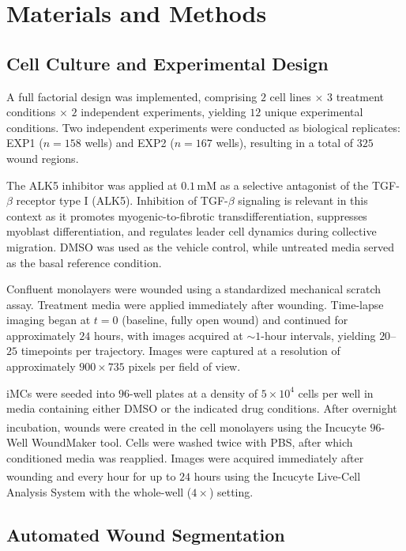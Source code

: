 \section{Materials and Methods}

\subsection{Cell Culture and Experimental Design}

A full factorial design was implemented, comprising $2$ cell lines $\times$ $3$ treatment conditions $\times$ $2$ independent experiments, yielding $12$ unique experimental conditions. Two independent experiments were conducted as biological replicates: EXP1 ($n = 158$ wells) and EXP2 ($n = 167$ wells), resulting in a total of $325$ wound regions.

The ALK5 inhibitor was applied at $0.1\,\mathrm{mM}$ as a selective antagonist of the TGF-$\beta$ receptor type I (ALK5). Inhibition of TGF-$\beta$ signaling is relevant in this context as it promotes myogenic-to-fibrotic transdifferentiation, suppresses myoblast differentiation, and regulates leader cell dynamics during collective migration. DMSO was used as the vehicle control, while untreated media served as the basal reference condition.

Confluent monolayers were wounded using a standardized mechanical scratch assay. Treatment media were applied immediately after wounding. Time-lapse imaging began at $t = 0$ (baseline, fully open wound) and continued for approximately $24$ hours, with images acquired at $\sim 1$-hour intervals, yielding $20$--$25$ timepoints per trajectory. Images were captured at a resolution of approximately $900 \times 735$ pixels per field of view.

iMCs were seeded into $96$-well plates at a density of $5 \times 10^{4}$ cells per well in media containing either DMSO or the indicated drug conditions. After overnight incubation, wounds were created in the cell monolayers using the Incucyte\textsuperscript{\textregistered} $96$-Well WoundMaker tool. Cells were washed twice with PBS, after which conditioned media was reapplied. Images were acquired immediately after wounding and every hour for up to $24$ hours using the Incucyte\textsuperscript{\textregistered} Live-Cell Analysis System with the whole-well ($4\times$) setting.

\subsection{Automated Wound Segmentation}

